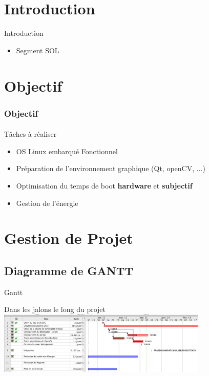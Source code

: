 \documentclass[11pt]{beamer}
\begin{document}
 	\section{Introduction}
	\begin{frame}{Introduction}
		\begin{itemize}
			\item Segment SOL
		\end{itemize}
	\end{frame}

 	\section{Objectif}
	\begin{frame}
		\frametitle{Objectif}
		\framesubtitle{}
	\begin{block}{Tâches à réaliser}
		\begin{itemize}
			\item OS Linux embarqué Fonctionnel
			\item Préparation de l'environnement graphique (Qt, openCV, ...)
			\item Optimisation du temps de boot \textbf<2>{hardware} et \textbf<2>{subjectif}
			\item Gestion de l'énergie
		\end{itemize}
	\end{block}
	\end{frame}
	
	\section{Gestion de Projet}
	\subsection{Diagramme de GANTT}
	\begin{frame}{Gantt}
		\begin{center}
			Dans les jalons le long du projet\\
			
			\includegraphics[width=10cm]{commons/Gantt.png}
		\end{center}
	\end{frame}
	
\end{document}
